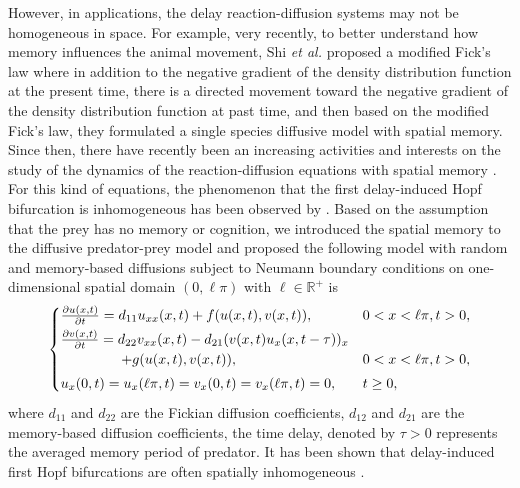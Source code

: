 \documentclass[11pt]{article}
\theoremstyle{definition}
\theoremstyle{remark}
\numberwithin{equation}{section}
\begin{document}
However, in applications, the delay reaction-diffusion systems may not be homogeneous in space. For example, very recently,  to better understand  how memory influences the animal movement, Shi {\it et al.}  \cite{Shi-WangYan-JDDE2020}  proposed a modified Fick's law where in addition to the negative gradient of the density distribution function at the present time, there is a directed movement toward the negative gradient of the density distribution function at past time, and then based on the modified Fick's law, they formulated a single species diffusive model with spatial memory. Since then, there have recently been an increasing activities and interests on the study of the dynamics of the reaction-diffusion equations with spatial memory \cite{Shi-Wang-Wang-Nonlinearity2019,Shi-WangYan-JDDE2020,An-Wang-Wang-DCDS2020,Oliveira-Kar-Ber-MB2020,Shi-Shi-Wang-JMB2021,Song-Shi-Wang-2021}. For this kind of equations,  the phenomenon that the first delay-induced Hopf bifurcation is inhomogeneous has been observed by \cite{Shi-Wang-Wang-Nonlinearity2019,Song-Wu-Wang-JDE2019}.
 Based on the assumption that  the prey has no memory or cognition,  we introduced the spatial memory to the diffusive predator-prey model and proposed the  following  model with random and memory-based diffusions subject to Neumann boundary conditions on one-dimensional spatial domain $(0, \ell \pi)$ with $\ell\in \mathbb{R}^+$ is
\begin{equation}
\label{PPMODEL}
  \begin{cases}\frac{\partial u(x,t)}{\partial t}=d_{11}u_{xx}(x,t)+f(u(x,t),v(x,t)), & 0<x<\ell\pi, t>0, \vspace{0.1cm}\\
\frac{\partial v(x,t)}{\partial t}=d_{22}v_{xx}(x,t)-d_{21}(v(x,t)u_{x}(x,t-\tau))_x & \\
\hspace{0.6in} +g(u(x,t),v(x,t)), & 0<x<\ell\pi, t>0,\vspace{0.1cm}\\
u_x(0,t)=u_x(\ell\pi,t)=v_x(0,t)=v_x(\ell\pi,t)=0, &t\geq0,
  \end{cases}
 \end{equation}
where $d_{11}$ and $d_{22}$ are the Fickian diffusion coefficients, $d_{12}$ and $d_{21}$ are the memory-based diffusion coefficients, the time delay, denoted by $\tau>0$ represents the averaged memory period of predator. It has been shown that delay-induced first Hopf bifurcations are often spatially inhomogeneous \cite{Song-Shi-Wang-2021}.
\end{document}

